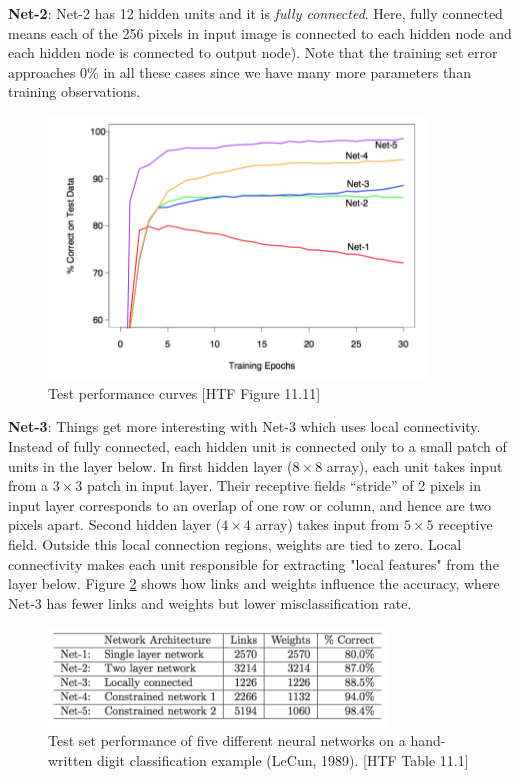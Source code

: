 \documentclass[a4paper]{article}
\begin{document}
\textbf{Net-2}: Net-2 has 12 hidden units and it is \textit{fully connected}. Here, fully connected means each of the 256 pixels in input image is connected to each hidden node and each hidden node is connected to output node). Note that the training set error approaches $0\%$ in all these cases since we have many more parameters than training observations. \\

\begin{figure}[h]
\label{fig:test_performance_curves}
\centering
\includegraphics[width=0.9\textwidth]{Test-Performance-Curves}
\caption{Test performance curves [HTF Figure 11.11]}
\end{figure}


\textbf{Net-3}: Things get more interesting with Net-3 which uses local connectivity. Instead of fully connected, each hidden unit is connected only to a small patch of units in the layer below. In first hidden layer ($8\times 8$ array), each unit takes input from a $3\times 3$ patch in input layer. Their receptive fields ``stride'' of 2 pixels in input layer corresponds to an overlap of one row or column, and hence are two pixels apart. Second hidden layer ($4\times 4$ array) takes input from $5\times 5$ receptive field. Outside this local connection regions, weights are tied to zero. Local connectivity makes each unit responsible for extracting "local features" from the layer below. Figure \ref{table11-11} shows how links and weights influence the accuracy, where Net-3 has fewer links and weights but lower misclassification rate.\\


\begin{figure}[h]
\label{table11-11}
\centering
\includegraphics[width=0.8\textwidth]{Test_set_performance_of_five_different_neural_networks_on_a_hand-_written_digit_classification_example}
\caption{Test set performance of five different neural networks on a hand- written digit classification example (LeCun, 1989). [HTF Table 11.1]}
\end{figure}
\end{document}
